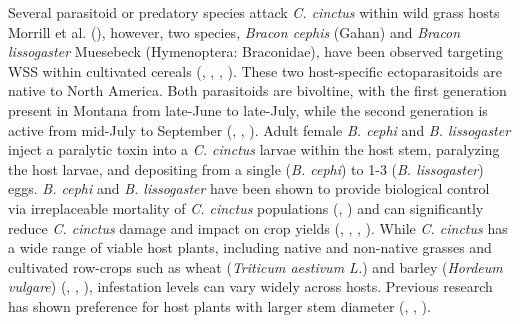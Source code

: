 \documentclass[
]{article}
\begin{document}
Several parasitoid or predatory species attack \emph{C. cinctus} within
wild grass hosts Morrill et al. (),
however, two species, \emph{Bracon cephis} (Gahan) and \emph{Bracon
lissogaster} Muesebeck (Hymenoptera: Braconidae), have been observed
targeting WSS within cultivated cereals
(,
,
,
). These two host-specific
ectoparasitoids are native to North America. Both parasitoids are
bivoltine, with the first generation present in Montana from late-June
to late-July, while the second generation is active from mid-July to
September (,
,
). Adult female \emph{B. cephi} and
\emph{B. lissogaster} inject a paralytic toxin into a \emph{C. cinctus}
larvae within the host stem, paralyzing the host larvae, and depositing
from a single (\emph{B. cephi}) to 1-3 (\emph{B. lissogaster}) eggs.
\emph{B. cephi} and \emph{B. lissogaster} have been shown to provide
biological control via irreplaceable mortality of \emph{C. cinctus}
populations (,
) and can significantly
reduce \emph{C. cinctus} damage and impact on crop yields
(,
,
,
). While \emph{C. cinctus} has
a wide range of viable host plants, including native and non-native
grasses and cultivated row-crops such as wheat (\emph{Triticum aestivum
L.}) and barley (\emph{Hordeum vulgare})
(,
,
), infestation levels can
vary widely across hosts. Previous research has shown preference for
host plants with larger stem diameter
(,
,
).
\end{document}
